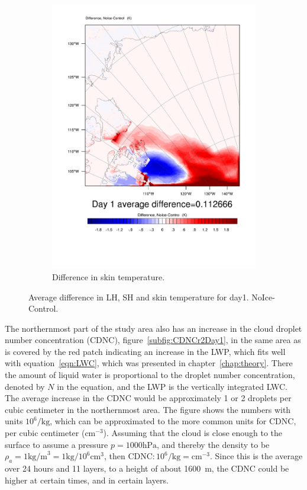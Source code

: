 \begin{figure}
		\begin{subfigure}{0.48\textwidth}
		\includegraphics[width=\textwidth]{results/noice/diff_NoIce_skintemp_Day1.pdf}
		\caption{Difference in skin temperature.}
		\label{subfig:skin_r2Day1}
	\end{subfigure}
	\caption{Average difference in LH, SH and skin temperature for day1. NoIce-Control.}
	\label{fig:lhshskin_r2Day1}
\end{figure}

The northernmost part of the study area also has an increase in the cloud droplet number concentration (CDNC), figure~\ref{subfig:CDNCr2Day1}, in the same area as is covered by the red patch indicating an increase in the LWP, which fits well with equation~\ref{eqn:LWC}, which was presented in chapter~\ref{chap:theory}. There the amount of liquid water is proportional to the droplet number concentration, denoted by $N$ in the equation, and the LWP is the vertically integrated LWC. The average increase in the CDNC would be approximately 1 or 2 droplets per cubic centimeter in the northernmost area. The figure shows the numbers with units $10^6/\text{kg}$, which can be approximated to the more common units for CDNC, per cubic centimeter ($\text{cm}^{-3}$). Assuming that the cloud is close enough to the surface to assume a pressure $p=1000\text{hPa}$, and thereby the density to be $\rho_a = 1\text{kg/m}^3=1\text{kg/}10^6\text{cm}^3$, then $\text{CDNC} : 10^6/\text{kg} = \text{cm}^{-3}$. Since this is the average over 24 hours and 11 layers, to a height of about 1600~m, the CDNC could be higher at certain times, and in certain layers.


